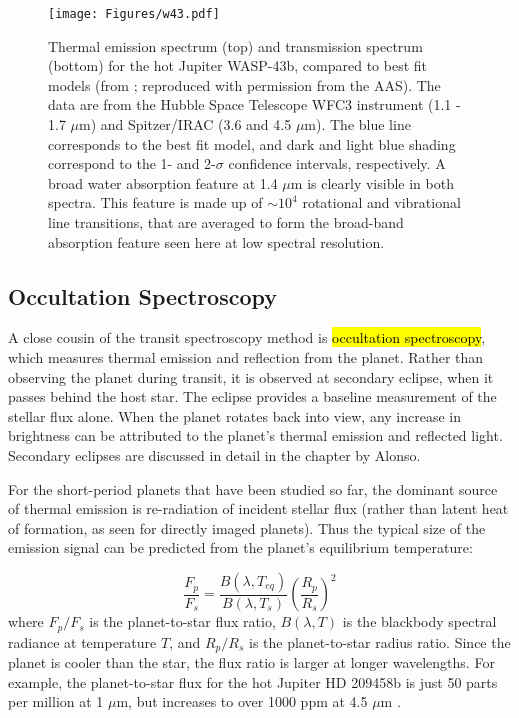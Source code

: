 \documentclass[graybox,natbib,nosecnum]{svmult}
\newcommand{\hbindex}[1]{\hl{#1}\index{#1}}  %
\begin{document}
\begin{figure}
\begin{centering}
\texttt{[image: Figures/w43.pdf]}
\caption{Thermal emission spectrum (top) and transmission spectrum (bottom) for the hot Jupiter WASP-43b, compared to best fit models (from \citealt{kreidberg15b}; reproduced with permission from the AAS). The data are from the Hubble Space Telescope WFC3 instrument (1.1 - 1.7 $\mu$m) and Spitzer/IRAC (3.6 and 4.5 $\mu$m). The blue line corresponds to the best fit model, and dark and light blue shading correspond to the 1- and 2-$\sigma$ confidence intervals, respectively. A broad water absorption feature at 1.4 $\mu$m is clearly visible in both spectra. This feature is made up of $\sim10^4$ rotational and vibrational line transitions, that are averaged to form the broad-band absorption feature seen here at low spectral resolution.} 
\label{fig:spectra}       
\end{centering}
\end{figure}


\subsection{Occultation Spectroscopy}
A close cousin of the transit spectroscopy method is \hbindex{occultation spectroscopy}, which measures thermal emission and reflection from the planet. Rather than observing the planet during transit, it is observed at secondary eclipse, when it passes behind the host star. The eclipse provides a baseline measurement of the stellar flux alone. When the planet rotates back into view, any increase in brightness can be attributed to the planet's thermal emission and reflected light. Secondary eclipses are discussed in detail in the chapter by Alonso.

For the short-period planets that have been studied so far, the dominant source of thermal emission is re-radiation of incident stellar flux (rather than latent heat of formation, as seen for directly imaged planets). Thus the typical size of the emission signal can be predicted from the planet's equilibrium temperature:

\begin{equation}
\label{eqn:fpfs}
\frac{F_p}{F_s} = \frac{B(\lambda, T_{eq})}{B(\lambda, T_s)}\left(\frac{R_p}{R_s}\right)^2
\end{equation}
where $F_p/F_s$ is the planet-to-star flux ratio, $B(\lambda, T)$ is the blackbody spectral radiance at temperature $T$, and $R_p/R_s$ is the planet-to-star radius ratio. Since the planet is cooler than the star, the flux ratio is larger at longer wavelengths. For example, the planet-to-star flux for the hot Jupiter HD 209458b is just 50 parts per million at 1 $\mu$m, but increases to over 1000 ppm at 4.5 $\mu$m \citep{line16}.
\end{document}
